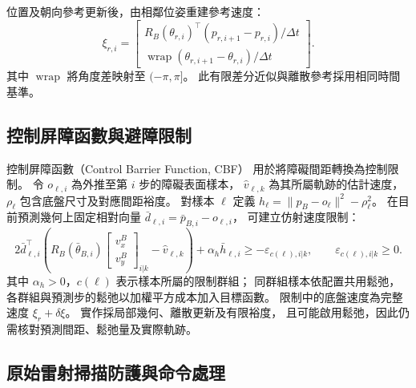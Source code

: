 位置及朝向參考更新後，由相鄰位姿重建參考速度：
\begin{equation}
    \xi_{r,i}=
    \begin{bmatrix}
        R_B(\theta_{r,i})^\top
        (p_{r,i+1}-p_{r,i})/\Delta t\\
        \operatorname{wrap}(\theta_{r,i+1}-\theta_{r,i})/\Delta t
    \end{bmatrix}.
    \label{eq:ch3_reference_velocity_reconstruction}
\end{equation}
其中 $\operatorname{wrap}$ 將角度差映射至 $(-\pi,\pi]$。
此有限差分近似與離散參考採用相同時間基準。

\subsection{控制屏障函數與避障限制}
\label{subsec:cbf_obstacle_constraints}

控制屏障函數（Control Barrier Function, CBF）
用於將障礙間距轉換為控制限制\cite{ames2019cbf}。
令 $o_{\ell,i}$ 為外推至第 $i$ 步的障礙表面樣本，
$\hat v_{\ell,k}$ 為其所屬軌跡的估計速度，
$\rho_\ell$ 包含底盤尺寸及對應間距裕度。
對樣本 $\ell$ 定義
$h_\ell=\|p_B-o_\ell\|^2-\rho_\ell^2$。
在目前預測幾何上固定相對向量
$\bar d_{\ell,i}=\bar p_{B,i}-o_{\ell,i}$，
可建立仿射速度限制：
\begin{equation}
    2\bar d_{\ell,i}^{\top}
    \left(R_B(\bar\theta_{B,i})
    \begin{bmatrix}v_x^B\\v_y^B\end{bmatrix}_{i|k}
    -\hat v_{\ell,k}\right)
    +\alpha_h\bar h_{\ell,i}
    \geq-\varepsilon_{c(\ell),i|k},
    \qquad \varepsilon_{c(\ell),i|k}\geq0 .
    \label{eq:ch3_cbf_affine_constraint}
\end{equation}
其中 $\alpha_h>0$，$c(\ell)$ 表示樣本所屬的限制群組；
同群組樣本依配置共用鬆弛，
各群組與預測步的鬆弛以加權平方成本加入目標函數。
限制中的底盤速度為完整速度 $\xi_r+\delta\xi$。
實作採局部幾何、離散更新及有限裕度，
且可能啟用鬆弛，因此仍需核對預測間距、鬆弛量及實際軌跡。

\subsection{原始雷射掃描防護與命令處理}
\label{subsec:raw_scan_command_protection}

